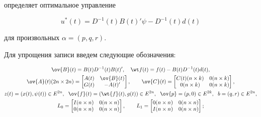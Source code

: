 определяет оптимальное управление


\begin{equation}


u^{\ast }(t)=D^{-1}(t)B(t)'\psi-D^{-1}(t)d(t)


\end{equation}


для произвольных $\alpha=(p,q,r)$.





Для упрощения записи введем следующие обозначения:


\begin{gather}


\ov {B}(t)=B(t)D^{-1}(t)B(t)', 


\quad \wt f(t)=f(t)-B(t)D^{-1}(t)d(t), \\


%


\ov {A}(t)(2n\times 2n)=


\begin{bmatrix}


A(t)&\ov {B}(t)\\ G(t)&-A(t)'


\end{bmatrix}


,\qquad \ov {C}(t)=


\begin{bmatrix}


C(t)(n\times k)&0(n\times k)\\ 0(n\times k)&0(n\times k)


\end{bmatrix}


, \notag \\


%


z(t)=(x(t),\psi (t))\in E^{2n},


\ \; \ov {f}(t)=(\wt {f}(t),g(t))\in E^{2n}, \ \;


\ov {p}=(p,0)\in E^{2k},\ \; b=(q,r)\in E^{2n}, \notag\\


%


L_{0}=


\begin{bmatrix}


I(n\times n)&0(n\times n)\\ 0(n\times n)&0(n\times n)


\end{bmatrix}


,


\qquad L_{1}=


\begin{bmatrix}


0(n\times n)&0(n\times n)\\ I(n\times n)&0(n\times n)


\end{bmatrix}


;\notag


\end{gather}



